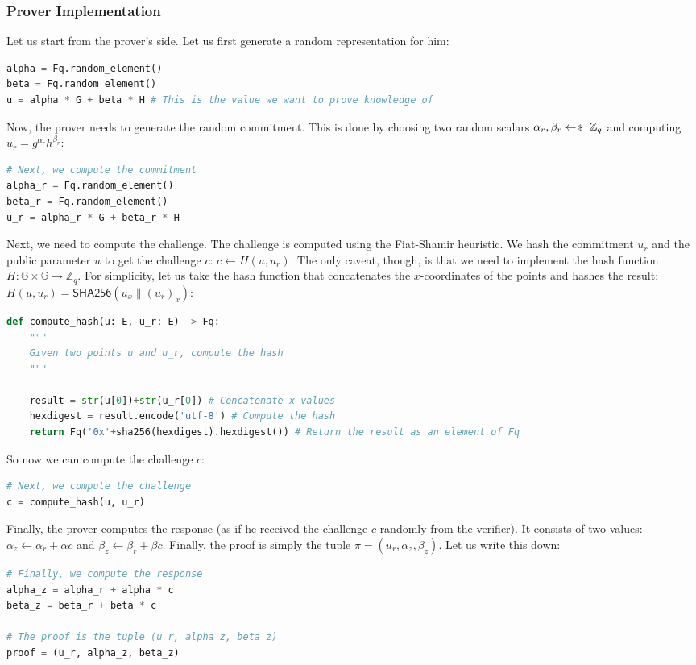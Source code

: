\documentclass[../lecture-notes-148x210.tex]{subfiles}
\begin{document}
\subsubsection{Prover Implementation}

Let us start from the prover's side. Let us first generate a random representation for him:
\begin{lstlisting}[language=Python]
alpha = Fq.random_element()
beta = Fq.random_element()
u = alpha * G + beta * H # This is the value we want to prove knowledge of
\end{lstlisting}

Now, the prover needs to generate the random commitment. This is done by choosing
two random scalars $\alpha_r, \beta_r \leftarrowS \mathbb{Z}_q$ and computing
$u_r = g^{\alpha_r}h^{\beta_r}$:
\begin{lstlisting}[language=Python]
# Next, we compute the commitment
alpha_r = Fq.random_element()
beta_r = Fq.random_element()
u_r = alpha_r * G + beta_r * H
\end{lstlisting}

Next, we need to compute the challenge. The challenge is computed using 
the Fiat-Shamir heuristic. We hash the commitment $u_r$ and the public
parameter $u$ to get the challenge $c$: $c \gets H(u,u_r)$. The only 
caveat, though, is that we need to implement the hash function 
$H: \mathbb{G} \times \mathbb{G} \to \mathbb{Z}_q$. For simplicity, let us 
take the hash function that concatenates the $x$-coordinates of the points
and hashes the result: $H(u,u_r) = \mathsf{SHA256}(u_x \parallel (u_r)_x)$:
\begin{lstlisting}[language=Python]
def compute_hash(u: E, u_r: E) -> Fq:
    """
    Given two points u and u_r, compute the hash
    """

    result = str(u[0])+str(u_r[0]) # Concatenate x values
    hexdigest = result.encode('utf-8') # Compute the hash
    return Fq('0x'+sha256(hexdigest).hexdigest()) # Return the result as an element of Fq
\end{lstlisting}

So now we can compute the challenge $c$:
\begin{lstlisting}[language=Python]
# Next, we compute the challenge
c = compute_hash(u, u_r)
\end{lstlisting}

Finally, the prover computes the response (as if he received the challenge $c$
randomly from the verifier). It consists of two values: $\alpha_z \gets \alpha_r
+ \alpha c$ and $\beta_z \gets \beta_r + \beta c$. Finally, the proof is simply
the tuple $\pi=(u_r,\alpha_z,\beta_z)$. Let us write this down:
\begin{lstlisting}[language=Python]
# Finally, we compute the response
alpha_z = alpha_r + alpha * c
beta_z = beta_r + beta * c

# The proof is the tuple (u_r, alpha_z, beta_z)
proof = (u_r, alpha_z, beta_z)
\end{lstlisting}
\end{document}
